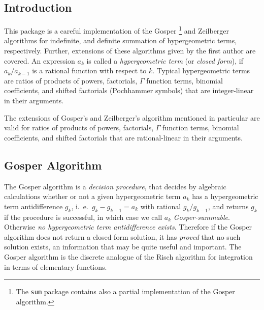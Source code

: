 
\newcommand{\funkdef}[3]{\left\{\!\!\!\begin{array}{cc}
                                #1 & \!\!\!\mbox{\rm{if} $#2$ } \\
                                #3 & \!\!\!\mbox{\rm{otherwise}}
                                \end{array}
                         \right.}

\subsection{Introduction}

This package is a careful implementation of the Gosper%
\footnote{The {\tt sum} package contains also a partial implementation
of the Gosper algorithm.}
and Zeilberger algorithms for indefinite, and definite summation of
hypergeometric terms, respectively. Further, extensions of these algorithms
given by the first author are covered. An expression $a_k$ is called a 
{\sl hypergeometric term} (or {\sl closed form}),
if $a_{k}/a_{k-1}$ is a rational function with respect to $k$.
Typical hypergeometric terms are ratios of products of powers, factorials, 
$\Gamma$ function terms, binomial coefficients, and shifted factorials 
(Pochhammer symbols) that are integer-linear in their arguments.

The extensions of Gosper's and Zeilberger's algorithm mentioned
in particular are valid for ratios of products of powers, factorials,
$\Gamma$ function terms, binomial coefficients, and shifted factorials
that are rational-linear in their arguments.

\subsection{Gosper Algorithm}

The Gosper algorithm \cite{Gos} is a {\sl decision procedure}, that
decides by algebraic calculations whether or not a given hypergeometric term
$a_k$ has a hypergeometric term antidifference $g_k$, i.\ e.\ 
$g_{k}-g_{k-1}=a_k$ with rational $g_k/g_{k-1}$, 
and returns $g_k$ if the procedure is successful, in which
case we call $a_k$ {\sl Gosper-summable}. Otherwise
{\sl no hypergeometric term antidifference exists}. Therefore
if the Gosper algorithm does not return a closed form solution,
it has {\sl proved} that no such solution exists, an information
that may be quite useful and important. 
The Gosper algorithm is the discrete analogue of the Risch algorithm
for integration in terms of elementary functions.


